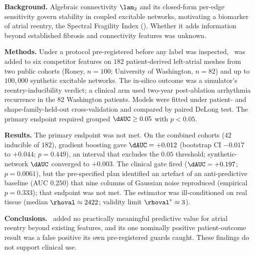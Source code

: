 \noindent\textbf{Background.} Algebraic connectivity $\lam_2$ and its closed-form
per-edge sensitivity govern stability in coupled excitable networks, motivating
a biomarker of atrial reentry, the Spectral Fragility Index (\SFI). Whether it
adds information beyond established fibrosis and connectivity features was
unknown.

\medskip
\noindent\textbf{Methods.} Under a protocol pre-registered before any label was
inspected, \SFI\ was added to six competitor features on $182$ patient-derived
left-atrial meshes from two public cohorts (Roney, $n=100$; University of
Washington, $n=82$) and up to $100{,}000$ synthetic excitable networks. The
in-silico outcome was a simulator's reentry-inducibility verdict; a clinical arm
used two-year post-ablation arrhythmia recurrence in the $82$ Washington
patients. Models were fitted under patient- and shape-family-held-out
cross-validation and compared by paired DeLong test. The primary endpoint
required grouped $\dAUC\geq0.05$ with $p<0.05$.

\medskip
\noindent\textbf{Results.} The primary endpoint was not met. On the combined
cohorts ($42$ inducible of $182$), gradient boosting gave $\dAUC=+0.012$
(bootstrap CI $-0.017$ to $+0.044$; $p=0.449$), an interval that excludes the
$0.05$ threshold; synthetic-network $\dAUC$ converged to $+0.003$. The clinical
gate fired ($\dAUC=+0.197$; $p=0.0061$), but the pre-specified plan identified
an artefact of an anti-predictive baseline (AUC $0.250$) that nine columns of
Gaussian noise reproduced (empirical $p=0.333$); that endpoint was not met. The
estimator was ill-conditioned on real tissue (median $\rhoval\approx2422$;
validity limit $\rhoval^{\ast}\approx3$).

\medskip
\noindent\textbf{Conclusions.} \SFI\ added no practically meaningful predictive
value for atrial reentry beyond existing features, and its one nominally
positive patient-outcome result was a false positive its own pre-registered
guards caught. These findings do not support clinical use.
